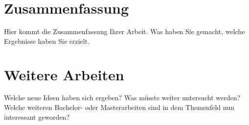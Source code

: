 \section{Zusammenfassung}
Hier kommt die Zusammenfassung Ihrer Arbeit. 
Was haben Sie gemacht, welche Ergebnisse haben Sie erzielt. 

\section{Weitere Arbeiten}
Welche neue Ideen haben sich ergeben? 
Was müsste weiter untersucht werden? 
Welche weiteren Bachelor- oder Masterarbeiten sind in dem Themenfeld nun interessant geworden? 
